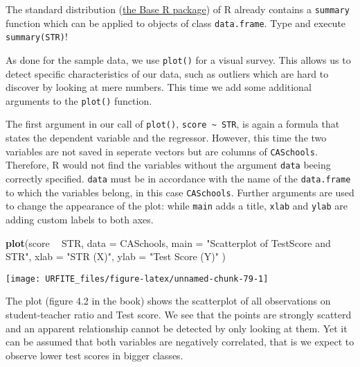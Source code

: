 \documentclass[]{book}
\newenvironment{Shaded}{\begin{snugshade}}{\end{snugshade}}
\newcommand{\KeywordTok}[1]{\textcolor[rgb]{0.13,0.29,0.53}{\textbf{#1}}}
\newcommand{\DataTypeTok}[1]{\textcolor[rgb]{0.13,0.29,0.53}{#1}}
\newcommand{\StringTok}[1]{\textcolor[rgb]{0.31,0.60,0.02}{#1}}
\newcommand{\OperatorTok}[1]{\textcolor[rgb]{0.81,0.36,0.00}{\textbf{#1}}}
\newcommand{\NormalTok}[1]{#1}
\theoremstyle{definition}
\theoremstyle{definition}
\theoremstyle{definition}
\theoremstyle{remark}
\begin{document}
The standard distribution
(\href{https://stat.ethz.ch/R-manual/R-devel/library/base/html/00Index.html}{the
Base R package}) of R already contains a \texttt{summary} function which
can be applied to objects of class \texttt{data.frame}. Type and execute
\texttt{summary(STR)}!

As done for the sample data, we use \texttt{plot()} for a visual survey.
This allows us to detect specific characteristics of our data, such as
outliers which are hard to discover by looking at mere numbers. This
time we add some additional arguments to the \texttt{plot()} function.

The first argument in our call of \texttt{plot()},
\texttt{score\ \textasciitilde{}\ STR}, is again a formula that states
the dependent variable and the regressor. However, this time the two
variables are not saved in seperate vectors but are columns of
\texttt{CASchools}. Therefore, R would not find the variables without
the argument \texttt{data} beeing correctly specified. \texttt{data}
must be in accordance with the name of the \texttt{data.frame} to which
the variables belong, in this case \texttt{CASchools}. Further arguments
are used to change the appearance of the plot: while \texttt{main} adds
a title, \texttt{xlab} and \texttt{ylab} are adding custom labels to
both axes.

\begin{Shaded}
\begin{Highlighting}[]
\KeywordTok{plot}\NormalTok{(score }\OperatorTok{~}\StringTok{ }\NormalTok{STR, }
     \DataTypeTok{data =}\NormalTok{ CASchools,}
     \DataTypeTok{main =} \StringTok{"Scatterplot of TestScore and STR"}\NormalTok{, }
     \DataTypeTok{xlab =} \StringTok{"STR (X)"}\NormalTok{,}
     \DataTypeTok{ylab =} \StringTok{"Test Score (Y)"}
\NormalTok{)}
\end{Highlighting}
\end{Shaded}

\begin{center}\texttt{[image: URFITE\_files/figure-latex/unnamed-chunk-79-1]} \end{center}

The plot (figure 4.2 in the book) shows the scatterplot of all
observations on student-teacher ratio and Test score. We see that the
points are strongly scatterd and an apparent relationship cannot be
detected by only looking at them. Yet it can be assumed that both
variables are negatively correlated, that is we expect to observe lower
test scores in bigger classes.
\end{document}
